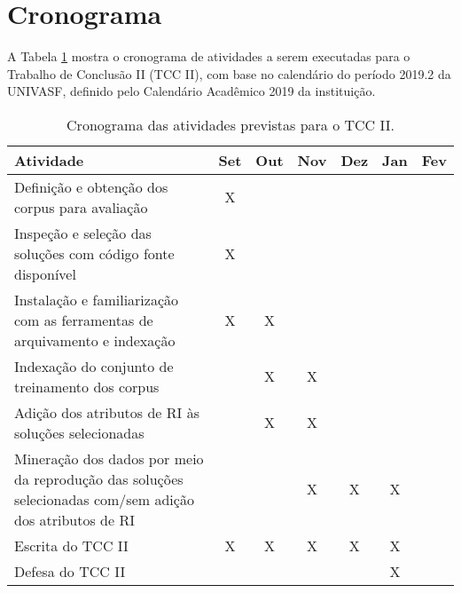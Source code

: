 
\section{Cronograma} \label{sec:Cronograma}

A Tabela \ref{tab:cronograma} mostra o cronograma de atividades a serem executadas para o Trabalho de Conclusão II (TCC II), com base no calendário do período 2019.2 da UNIVASF, definido pelo Calendário Acadêmico 2019 da instituição.

\begin{table}[!thb]
    \centering
    \caption{Cronograma das atividades previstas para o TCC II.}
    \begin{adjustbox}{max width={\textwidth},keepaspectratio}%
    \begin{tabular}{@{} p{6.5cm}|c|c|c|c|c|c @{}}
        \toprule
        \textbf{Atividade}
        & Set & Out & Nov & Dez & Jan & Fev
        \\ \hline
        Definição e obtenção dos corpus para avaliação 
        & X   &     &     &     &     &          
        \\ \hline
        Inspeção e seleção das soluções com código fonte disponível
        & X   &     &     &     &     &          
        \\ \hline
        Instalação e familiarização com as ferramentas de arquivamento e indexação
        & X   & X   &     &     &     &          
        \\ \hline
        Indexação do conjunto de treinamento dos corpus
        &     & X   & X   &     &     &          
        \\ \hline
        Adição dos atributos de RI às soluções selecionadas
        &     & X   & X   &     &     &    
        \\ \hline
        Mineração dos dados por meio da reprodução das soluções selecionadas com/sem adição dos atributos de RI
        &     &     & X   & X   & X   &  
        \\ \hline
        Escrita do TCC II                       
        & X   & X   & X   & X   & X   &         
        \\ \hline
        Defesa do TCC II                        
        &     &     &     &     & X   &        
        \\
        \bottomrule
    \end{tabular}
    \end{adjustbox}
    \label{tab:cronograma} 
\end{table}